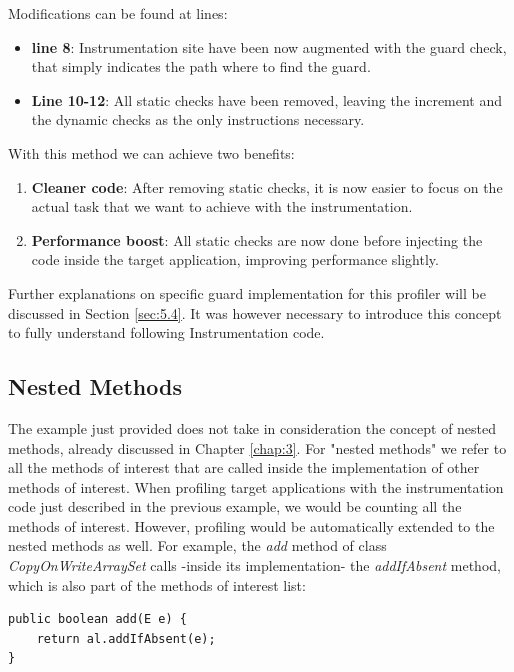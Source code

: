 \documentclass[]{usiinfthesis}
\begin{document}
\vspace*{0.5cm}

\noindent
Modifications can be found at lines:
\begin{itemize}
    \item \textbf{line 8}: Instrumentation site have been now augmented with the guard check, that simply indicates the path where to find the guard.
    
    \item \textbf{Line 10-12}: All static checks have been removed, leaving the increment and the dynamic checks as the only instructions necessary.
\end{itemize}

\noindent
With this method we can achieve two benefits:
\begin{enumerate}
    \item \textbf{Cleaner code}: After removing static checks, it is now easier to focus on the actual task that we want to achieve with the instrumentation.
    
    \item \textbf{Performance boost}: All static checks are now done before injecting the code inside the target application, improving performance slightly.
\end{enumerate}

\noindent
Further explanations on specific guard implementation for this profiler will be discussed in Section \ref{sec:5.4}. It was however necessary to introduce this concept to fully understand following Instrumentation code.

\subsection{Nested Methods}
The example just provided does not take in consideration the concept of nested methods, already discussed in Chapter \ref{chap:3}. For "nested methods" we refer to all the methods of interest that are called inside the implementation of other methods of interest. When profiling target applications with the instrumentation code just described in the previous example, we would be counting all the methods of interest. However, profiling would be automatically extended to the nested methods as well. For example, the \textit{add} method of class \textit{CopyOnWriteArraySet} calls -inside its implementation- the \textit{addIfAbsent} method, which is also part of the methods of interest list:

\begin{verbatim}
public boolean add(E e) {
    return al.addIfAbsent(e);
}
\end{verbatim}
\end{document}
